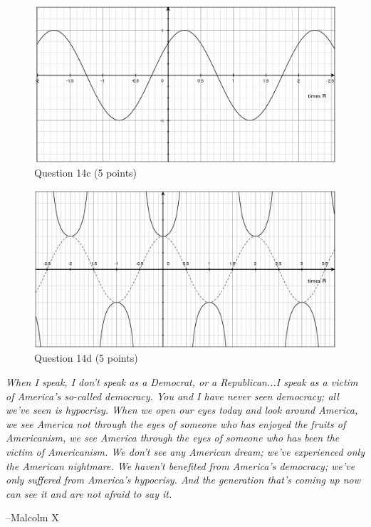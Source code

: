 \documentclass{exam}
\begin{document}
\begin{description}
\item
\begin{figure}[H]
  \centering
  \includegraphics[scale=.3]{question_14c.eps}
  \caption*{Question 14c (5 points)}
\end{figure}

\item
\begin{figure}[H]
  \centering
  \includegraphics[scale=.3]{question_14d.eps}
  \caption*{Question 14d (5 points)}
\end{figure}



\end{description}

\else

\vspace{8 cm}

{\em When I speak, I don't speak as a Democrat, or a Republican...I speak as a victim of America's so-called democracy. You
  and I have never seen democracy; all we've seen is hypocrisy. When we open our eyes today and look around America, we
  see America not through the eyes of someone who has enjoyed the fruits of Americanism, we see America
  through the eyes of someone who has been the victim of Americanism. We don’t see any American dream; we've experienced
  only the American nightmare. We haven't benefited from America's democracy; we've only suffered from America's
  hypocrisy. And the generation that's coming up now can see it and are not afraid to say it.}

\vspace{.2 cm}

\hspace{1 cm} --Malcolm X

\fi
\end{document}
